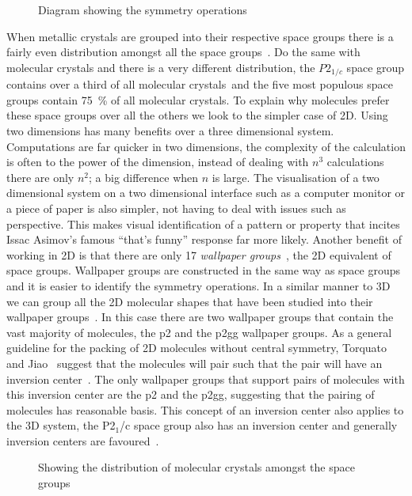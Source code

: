 \begin{figure}
    \caption{Diagram showing the symmetry operations}
    \label{fig:symmetry ops}
\end{figure}

When metallic crystals are grouped into their respective space groups there is a fairly even distribution amongst all the space groups~. Do the same with molecular crystals and there is a very different distribution, the $P2_{1/c}$ space group contains over a third of all molecular crystals~\tocite and the five most populous space groups contain \SI{75}{\percent} of all molecular crystals. To explain why molecules prefer these space groups over all the others we look to the simpler case of 2D. Using two dimensions has many benefits over a three dimensional system. Computations are far quicker in two dimensions, the complexity of the calculation is often to the power of the dimension, instead of dealing with $n^3$ calculations there are only $n^2$; a big difference when $n$ is large. The visualisation of a two dimensional system on a two dimensional interface such as a computer monitor or a piece of paper is also simpler, not having to deal with issues such as perspective. This makes visual identification of a pattern or property that incites Issac Asimov's famous ``that's funny'' response far more likely. Another benefit of working in 2D is that there are only 17 \emph{wallpaper groups}~, the 2D equivalent of space groups. Wallpaper groups are constructed in the same way as space groups and it is easier to identify the symmetry operations. In a similar manner to 3D we can group all the 2D molecular shapes that have been studied into their wallpaper groups~. In this case there are two wallpaper groups that contain the vast majority of molecules, the p2 and the p2gg wallpaper groups. As a general guideline for the packing of 2D molecules without central symmetry, Torquato and Jiao~\cite{torquato:12} suggest that the molecules will pair such that the pair will have an inversion center~. The only wallpaper groups that support pairs of molecules with this inversion center are the p2 and the p2gg, suggesting that the pairing of molecules has reasonable basis. This concept of an inversion center also applies to the 3D system, the P2$_1$/c space group also has an inversion center and generally inversion centers are favoured~\cite{brock:94}.

\begin{figure}
    \centering
    \caption{Showing the distribution of molecular crystals amongst the space groups}
    \label{fig:space dist}
\end{figure}


